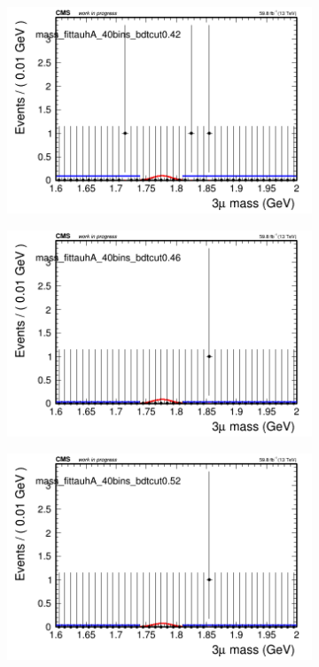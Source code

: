 \begin{figure}[H]
\begin{subfigure}{0.2\textwidth}
        \caption{}
    \end{subfigure}
    \begin{subfigure}{0.2\textwidth}
        \includegraphics[width=\textwidth]{flat_fit/plots/tauhA/massfit_tauhA_40bins_bdtcut0.42.png}
        \caption{}
    \end{subfigure}
    \begin{subfigure}{0.2\textwidth}
        \includegraphics[width=\textwidth]{flat_fit/plots/tauhA/massfit_tauhA_40bins_bdtcut0.46.png}
        \caption{}
    \end{subfigure}
    \begin{subfigure}{0.2\textwidth}
        \includegraphics[width=\textwidth]{flat_fit/plots/tauhA/massfit_tauhA_40bins_bdtcut0.52.png}

\end{subfigure}
\end{figure}
